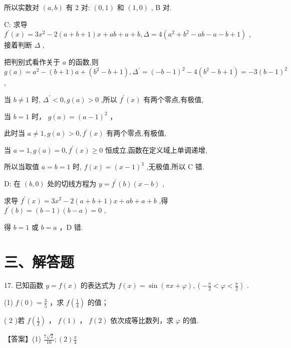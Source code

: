 \documentclass[10pt]{article}
\begin{document}
所以实数对 \(\left( {a,b}\right)\) 有 2 对: \(\left( {0,1}\right)\) 和 \(\left( {1,0}\right)\) , B 对.

C: 求导 \({f}^{\prime }\left( x\right)  = 3{x}^{2} - 2\left( {a + b + 1}\right) x + {ab} + a + b,\Delta  = 4\left( {{a}^{2} + {b}^{2} - {ab} - a - b + 1}\right)\) ,接着判断 \(\Delta\) ,

把判别式看作关于 \(a\) 的函数,则 \(g\left( a\right)  = {a}^{2} - \left( {b + 1}\right) a + \left( {{b}^{2} - b + 1}\right) ,{\Delta }^{\prime } = {\left( -b - 1\right) }^{2} - 4\left( {{b}^{2} - b + 1}\right)  =  - 3{\left( b - 1\right) }^{2}\) ,

当 \(b \neq  1\) 时, \({\Delta }^{\prime } < 0,g\left( a\right)  > 0\) ,所以 \({f}^{\prime }\left( x\right)\) 有两个零点,有极值,

当 \(b = 1\) 时， \(g\left( a\right)  = {\left( a - 1\right) }^{2}\) ，

此时当 \(a \neq  1,g\left( a\right)  > 0,{f}^{\prime }\left( x\right)\) 有两个零点,有极值,

当 \(a = 1,g\left( a\right)  = 0,{f}^{\prime }\left( x\right)  \geq  0\) 恒成立,函数在定义域上单调递增,

所以当取值 \(a = b = 1\) 时, \(f\left( x\right)  = {\left( x - 1\right) }^{3}\) ,无极值,所以 \(\mathrm{C}\) 错.

D: 在 \(\left( {b,0}\right)\) 处的切线方程为 \(y = {f}^{\prime }\left( b\right) \left( {x - b}\right)\) ,

求导 \({f}^{\prime }\left( x\right)  = 3{x}^{2} - 2\left( {a + b + 1}\right) x + {ab} + a + b\) ,得 \({f}^{\prime }\left( b\right)  = \left( {b - 1}\right) \left( {b - a}\right)  = 0\) ,

得 \(b = 1\) 或 \(b = a\) ，D 错.

\section*{三、解答题}

17. 已知函数 \(y = f\left( x\right)\) 的表达式为 \(f\left( x\right)  = \sin \left( {{\pi x} + \varphi }\right) ,\left( {-\frac{\pi }{2} < \varphi  < \frac{\pi }{2}}\right)\) .

(1) \(f\left( 0\right)  = \frac{3}{5}\) ，求 \(f\left( \frac{1}{4}\right)\) 的值；

( 2 )若 \(f\left( \frac{1}{2}\right)\) ， \(f\left( 1\right)\) ， \(f\left( 2\right)\) 依次成等比数列，求 \(\varphi\) 的值.

【答案】(1) \(\frac{7\sqrt{2}}{10};\left( 2\right) \frac{\pi }{4}\)
\end{document}

